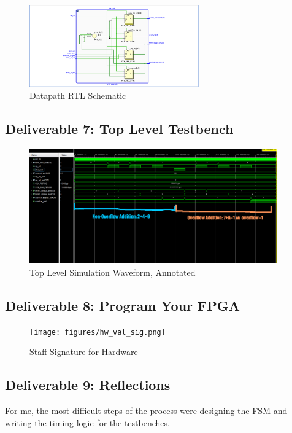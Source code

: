 \documentclass[10pt]{article}
\begin{document}
\begin{figure} [H]
  \center
  \includegraphics[width=0.65\textwidth]{figures/datapath_rtl.png}
  \caption{Datapath RTL Schematic}
\end{figure}

\subsection*{Deliverable 7: Top Level Testbench}

\begin{figure} [H]
  \center
  \includegraphics[width=0.95\textwidth]{figures/shell_tb_annotated.png}
  \caption{Top Level Simulation Waveform, Annotated}
\end{figure}

\subsection*{Deliverable 8: Program Your FPGA}

\begin{figure} [H]
  \center
  \texttt{[image: figures/hw\_val\_sig.png]}
  \caption{Staff Signature for Hardware}
\end{figure}

\subsection*{Deliverable 9: Reflections}
For me, the most difficult steps of the process were designing the FSM and writing the timing logic for the testbenches.
\end{document}
